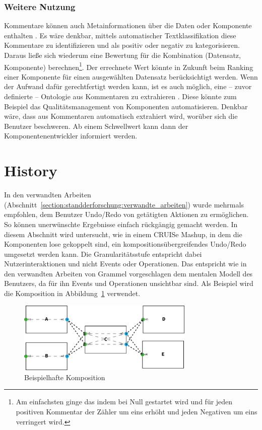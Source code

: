 \documentclass[
	headsepline,
	footsepline,
	fontsize=12pt,
	bibliography=totoc
]{scrbook}
\begin{document}
\subsubsection{Weitere Nutzung}


Kommentare können auch Metainformationen über die Daten oder Komponente enthalten \cite{Chen2009}. Es wäre denkbar, mittels automatischer Textklassifikation \cite{Sebastiani2002} diese Kommentare zu identifizieren und als positiv oder negativ zu kategorisieren. Daraus ließe sich wiederum eine Bewertung für die Kombination (Datensatz, Komponente) berechnen\footnote{Am einfachsten ginge das indem bei Null gestartet wird und für jeden positiven Kommentar der Zähler um eins erhöht und jeden Negativen um eins verringert wird.}. Der errechnete Wert könnte in Zukunft beim Ranking einer Komponente für einen ausgewählten Datensatz berücksichtigt werden. Wenn der Aufwand dafür gerechtfertigt werden kann, ist es auch möglich, eine -- zuvor definierte -- Ontologie aus Kommentaren zu extrahieren \cite{Alani2003}. Diese könnte zum Beispiel das Qualitätsmanagement von Komponenten automatisieren. Denkbar wäre, dass aus Kommentaren automatisch extrahiert wird, worüber sich die Benutzer beschweren. Ab einem Schwellwert kann dann der Komponentenentwickler informiert werden.

\section{History}
\label{section:konzeption:history}


In den verwandten Arbeiten (Abschnitt~\ref{section:standderforschung:verwandte_arbeiten}) wurde mehrmals empfohlen, dem Benutzer Undo/Redo von getätigten Aktionen zu ermöglichen. So können unerwünschte Ergebnisse einfach rückgängig gemacht werden. In diesem Abschnitt wird untersucht, wie in einem CRUISe Mashup, in dem die Komponenten lose gekoppelt sind, ein kompositionsübergreifendes Undo/Redo umgesetzt werden kann. Die Granularitätsstufe entspricht dabei Nutzerinteraktionen und nicht Events oder Operationen. Das entspricht wie in den verwandten Arbeiten von Grammel \cite{Grammel2012} vorgeschlagen dem mentalen Modell des Benutzers, da für ihn Events und Operationen unsichtbar sind. Als Beispiel wird die Komposition in Abbildung~\ref{figure:dependency-graph-example} verwendet.

\begin{figure}[htbp]
   \centering
   \includegraphics[width=0.75\textwidth]{images/konzeption-dependency-graph-example.png}
   \caption{Beispielhafte Komposition}
   \label{figure:dependency-graph-example}
\end{figure}
\end{document}
